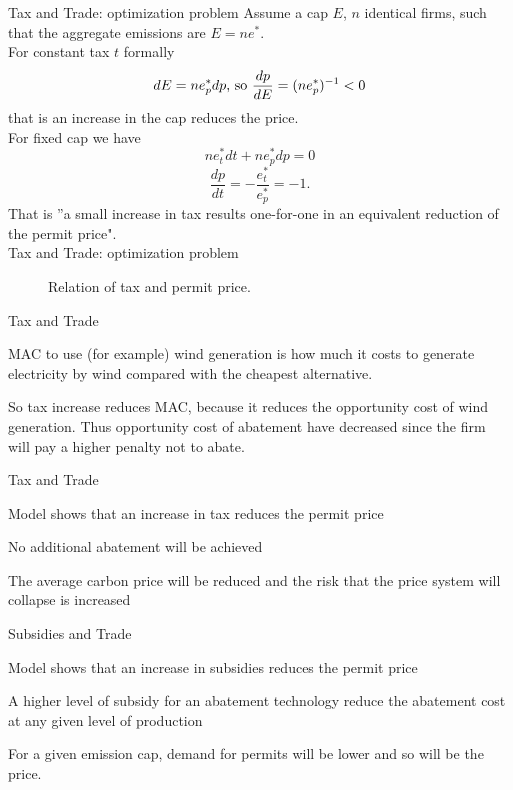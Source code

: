 
{Tax and Trade: optimization problem}
Assume a cap $E$, $n$ identical firms, such that the aggregate emissions are $E=ne^*$. \\
For constant tax $t$ formally
\[
dE = ne^*_pdp \textnormal{, so } \frac{dp}{dE} = (ne^*_p)^{-1} < 0
\]
that is an increase in the cap reduces the price. \\
For fixed cap we have
\[
ne^*_tdt+ne^*_pdp=0
\]
\[
\frac{dp}{dt}=-\frac{e^*_t}{e^*_p}=-1.
\]
That is ''a small increase in tax results one-for-one in an equivalent reduction of the permit price". \\


{Tax and Trade: optimization problem}
\begin{center}
\begin{figure}[h!]
\centering
{}
\caption{Relation of tax and permit price.}
\end{figure}
\end{center}


{Tax and Trade}
\item <1-> MAC to use (for example) wind generation is how much it costs to generate electricity by wind compared with the cheapest alternative. \\
\item <2-> So tax increase reduces MAC, because it reduces the opportunity cost of wind generation. Thus opportunity cost of abatement have decreased since the firm will pay a higher penalty not to abate.

{Tax and Trade}
\item<1-> Model shows that an increase in tax reduces the permit price
\item<2-> No additional abatement will be achieved
\item<3-> The average carbon price will be reduced and the risk that the price system will collapse is increased

{Subsidies and Trade}
\item<1-> Model shows that an increase in subsidies reduces the permit price
\item<2-> A higher level of subsidy for an abatement technology reduce the abatement cost at any given level of production
\item<3-> For a given emission cap, demand for permits will be lower and so will be the price.

